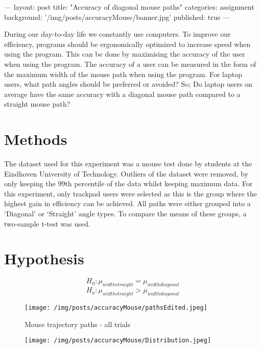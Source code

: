 ---
layout: post
title:  "Accuracy of diagonal mouse paths"
categories: assignment
background: '/img/posts/accuracyMouse/banner.jpg'
published: true
---
\usepackage{graphicx}
\usepackage{amsmath}
During our day-to-day life we constantly use computers. To improve our efficiency, programs should be ergonomically optimized to increase speed when using the program. This can be done by maximising the accuracy of the user when using the program. The accuracy of a user can be measured in the form of the maximum width of the mouse path when using the program. For laptop users, what path angles should be preferred or avoided? So; Do laptop users on average have the same accuracy with a diagonal mouse path compared to a straight mouse path? 

\section*{Methods}
The dataset used for this experiment was a mouse test done by students at the Eindhoven University of Technology. Outliers of the dataset were removed, by only keeping the 99th percentile of the data whilst keeping maximum data. For this experiment, only trackpad users were selected as this is the group where the highest gain in efficiency can be achieved. All paths were either grouped into a ‘Diagonal’ or ‘Straight’ angle types. To compare the means of these groups, a two-sample t-test was used.  

\section*{Hypothesis}
  $$H_0: \mu_{width straight} = \mu_{width diagonal}$$
  $$H_a: \mu_{width straight} > \mu_{width diagonal}$$

\begin{figure}
	\texttt{[image: /img/posts/accuracyMouse/pathsEdited.jpeg]}
	\caption{Mouse trajectory paths - all trials}
\end{figure}

\begin{figure}
    \texttt{[image: /img/posts/accuracyMouse/Distribution.jpeg]}
    \label{fig:dist}
\end{figure}



